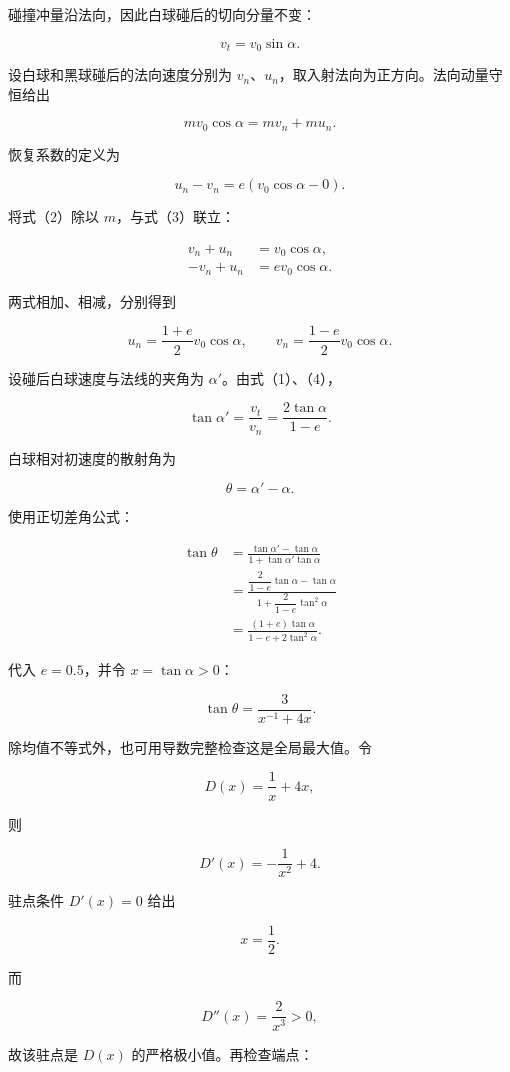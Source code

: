 \documentclass[12pt,a4paper,UTF8]{ctexart}
\begin{document}
碰撞冲量沿法向，因此白球碰后的切向分量不变：

\[v_t=v_0\sin\alpha. \tag{1}\]

设白球和黑球碰后的法向速度分别为
\(v_n\)、\(u_n\)，取入射法向为正方向。法向动量守恒给出

\[mv_0\cos\alpha=mv_n+mu_n. \tag{2}\]

恢复系数的定义为

\[u_n-v_n=e(v_0\cos\alpha-0). \tag{3}\]

将式（2）除以 \(m\)，与式（3）联立：

\[\begin{aligned}
v_n+u_n&=v_0\cos\alpha,\\
-v_n+u_n&=e v_0\cos\alpha.
\end{aligned}\]

两式相加、相减，分别得到

\[u_n=\frac{1+e}{2}v_0\cos\alpha,\qquad
v_n=\frac{1-e}{2}v_0\cos\alpha. \tag{4}\]

设碰后白球速度与法线的夹角为 \(\alpha'\)。由式（1）、（4），

\[\tan\alpha'=\frac{v_t}{v_n}
=\frac{2\tan\alpha}{1-e}. \tag{5}\]

白球相对初速度的散射角为

\[\theta=\alpha'-\alpha.\]

使用正切差角公式：

\[\begin{aligned}
\tan\theta
&=\frac{\tan\alpha'-\tan\alpha}
{1+\tan\alpha'\tan\alpha}\\
&=\frac{\dfrac{2}{1-e}\tan\alpha-\tan\alpha}
{1+\dfrac{2}{1-e}\tan^2\alpha}\\
&=\frac{(1+e)\tan\alpha}
{1-e+2\tan^2\alpha}.
\end{aligned} \tag{6}\]

代入 \(e=0.5\)，并令 \(x=\tan\alpha>0\)：

\[\tan\theta=\frac{3}{x^{-1}+4x}. \tag{7}\]

除均值不等式外，也可用导数完整检查这是全局最大值。令

\[D(x)=\frac1x+4x,\]

则

\[D'(x)=-\frac1{x^2}+4.\]

驻点条件 \(D'(x)=0\) 给出

\[x=\frac12.\]

而

\[D''(x)=\frac{2}{x^3}>0,\]

故该驻点是 \(D(x)\) 的严格极小值。再检查端点：
\end{document}
